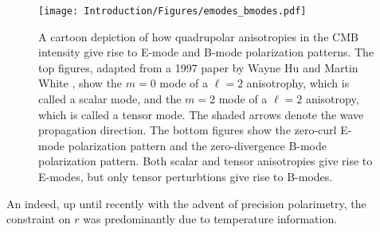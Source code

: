 \begin{figure}[!t]
    \centering
    \texttt{[image: Introduction/Figures/emodes\_bmodes.pdf]}
    \caption[Stokes parameters, E-modes, B-modes in the flat-sky approximation]{A cartoon depiction of how quadrupolar anisotropies in the CMB intensity give rise to E-mode and B-mode polarization patterns. The top figures, adapted from a 1997 paper by Wayne Hu and Martin White \cite{hu_cmb_1997}, show the $m = 0$ mode of a $\ell = 2$ anisotrophy, which is called a scalar mode, and the $m = 2$ mode of a $\ell = 2$ anisotropy, which is called a tensor mode. The shaded arrows denote the wave propagation direction. The bottom figures show the zero-curl E-mode polarization pattern and the zero-divergence B-mode polarization pattern. Both scalar and tensor anisotropies give rise to E-modes, but only tensor perturbtions give rise to B-modes.}
    \label{fig:emodes_bmodes}
\end{figure}

An indeed, up until recently with the advent of precision polarimetry, the constraint on $r$ was predominantly due to temperature information. 

